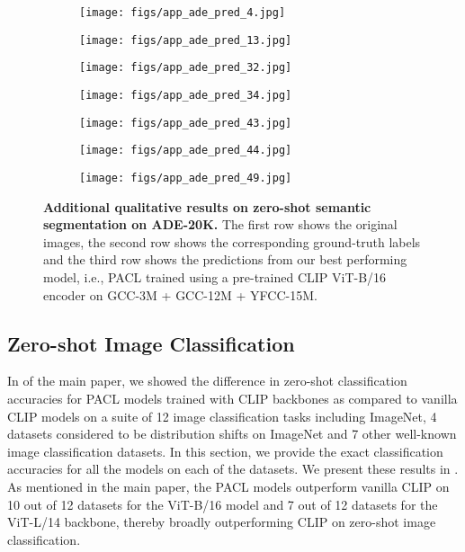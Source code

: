 \documentclass[10pt,twocolumn,letterpaper]{article}
\begin{document}
\begin{figure}[!t]
    \begin{subfigure}{0.12\linewidth}
        \centering
        \texttt{[image: figs/app\_ade\_pred\_4.jpg]}
\end{subfigure}
    \begin{subfigure}{0.12\linewidth}
        \centering
        \texttt{[image: figs/app\_ade\_pred\_13.jpg]}
\end{subfigure}
    \begin{subfigure}{0.12\linewidth}
        \centering
        \texttt{[image: figs/app\_ade\_pred\_32.jpg]}
\end{subfigure}
    \begin{subfigure}{0.15\linewidth}
        \centering
        \texttt{[image: figs/app\_ade\_pred\_34.jpg]}
\end{subfigure}
    \begin{subfigure}{0.135\linewidth}
        \centering
        \texttt{[image: figs/app\_ade\_pred\_43.jpg]}
\end{subfigure}
    \begin{subfigure}{0.12\linewidth}
        \centering
        \texttt{[image: figs/app\_ade\_pred\_44.jpg]}
\end{subfigure}
    \begin{subfigure}{0.16\linewidth}
        \centering
        \texttt{[image: figs/app\_ade\_pred\_49.jpg]}
\end{subfigure}

    \caption{\textbf{Additional qualitative results on zero-shot semantic segmentation on ADE-20K.} The first row shows the original images, the second row shows the corresponding ground-truth labels and the third row shows the predictions from our best performing model, i.e., PACL trained using a pre-trained CLIP ViT-B/16 encoder on GCC-3M + GCC-12M + YFCC-15M.}
    \vspace{-4mm}
    \label{fig:app_segmentation_ade20k}
\end{figure}



\subsection{Zero-shot Image Classification}
\label{app:zeroshot_image_classification}

In  of the main paper, we showed the difference in zero-shot classification accuracies for PACL models trained with CLIP backbones as compared to vanilla CLIP models on a suite of 12 image classification tasks including ImageNet, 4 datasets considered to be distribution shifts on ImageNet and 7 other well-known image classification datasets. In this section, we provide the exact classification accuracies for all the models on each of the datasets. We present these results in . As mentioned in the main paper, the PACL models outperform vanilla CLIP on 10 out of 12 datasets for the ViT-B/16 model and 7 out of 12 datasets for the ViT-L/14 backbone, thereby broadly outperforming CLIP on zero-shot image classification.
\end{document}
